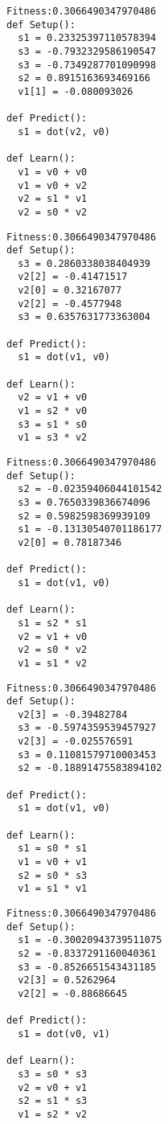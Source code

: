 \documentclass[twocolumn, a4j]{jarticle}
\begin{document}
\newpage

\begin{lstlisting}[caption= No. 0.21]
Fitness:0.3066490347970486 
def Setup():
  s1 = 0.23325397110578394
  s3 = -0.7932329586190547
  s3 = -0.7349287701090998
  s2 = 0.8915163693469166
  v1[1] = -0.080093026

def Predict():
  s1 = dot(v2, v0)

def Learn():
  v1 = v0 + v0
  v1 = v0 + v2
  v2 = s1 * v1
  v2 = s0 * v2

\end{lstlisting}

\begin{lstlisting}[caption= No. 0.22]
Fitness:0.3066490347970486 
def Setup():
  s3 = 0.2860338038404939
  v2[2] = -0.41471517
  v2[0] = 0.32167077
  v2[2] = -0.4577948
  s3 = 0.6357631773363004

def Predict():
  s1 = dot(v1, v0)

def Learn():
  v2 = v1 + v0
  v1 = s2 * v0
  s3 = s1 * s0
  v1 = s3 * v2

\end{lstlisting}

\newpage

\begin{lstlisting}[caption= No. 0.23]
Fitness:0.3066490347970486 
def Setup():
  s2 = -0.02359406044101542
  s3 = 0.7650339836674096
  s2 = 0.5982598369939109
  s1 = -0.13130540701186177
  v2[0] = 0.78187346

def Predict():
  s1 = dot(v1, v0)

def Learn():
  s1 = s2 * s1
  v2 = v1 + v0
  v2 = s0 * v2
  v1 = s1 * v2

\end{lstlisting}

\begin{lstlisting}[caption= No. 0.24]
Fitness:0.3066490347970486 
def Setup():
  v2[3] = -0.39482784
  s3 = -0.5974359539457927
  v2[3] = -0.025576591
  s3 = 0.11081579710003453
  s2 = -0.18891475583894102

def Predict():
  s1 = dot(v1, v0)

def Learn():
  s1 = s0 * s1
  v1 = v0 + v1
  s2 = s0 * s3
  v1 = s1 * v1

\end{lstlisting}

\newpage

\begin{lstlisting}[caption= No. 0.25]
Fitness:0.3066490347970486 
def Setup():
  s1 = -0.30020943739511075
  s2 = -0.8337291160040361
  s3 = -0.8526651543431185
  v2[3] = 0.5262964
  v2[2] = -0.88686645

def Predict():
  s1 = dot(v0, v1)

def Learn():
  s3 = s0 * s3
  v2 = v0 + v1
  s2 = s1 * s3
  v1 = s2 * v2

\end{lstlisting}
\end{document}
